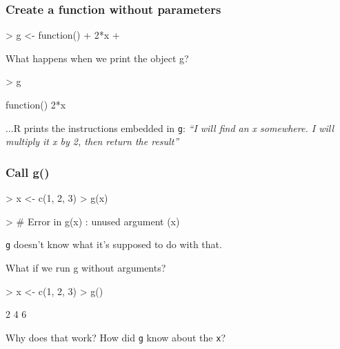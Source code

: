 \documentclass{beamer}
\newcommand{\R}[1]{\texttt{#1}}
\begin{document}
\begin{frame}[fragile]
\frametitle{Create a function without parameters}
\begin{Schunk}
\begin{Sinput}
> g <- function() {
+     2*x
+ }
\end{Sinput}
\end{Schunk}
\pause
What happens when we print the object g?
\begin{Schunk}
\begin{Sinput}
> g
\end{Sinput}
\end{Schunk}
\pause
\begin{Schunk}
\begin{Soutput}
function() {
    2*x
}
\end{Soutput}
\end{Schunk}
...R prints the instructions embedded in \R{g}: \textit{``I will find an x somewhere. I will multiply it x by 2, then return the result''}

\end{frame}





\begin{frame}[fragile]
\frametitle{Call g()}
\begin{Schunk}
\begin{Sinput}
> x <- c(1, 2, 3)
> g(x)
\end{Sinput}
\end{Schunk}
\pause
\begin{Schunk}
\begin{Sinput}
> # Error in g(x) : unused argument (x)
\end{Sinput}
\end{Schunk}
\R{g} doesn't know what it's supposed to do with that.

\pause
What if we run g without arguments?
\begin{Schunk}
\begin{Sinput}
> x <- c(1, 2, 3)
> g()
\end{Sinput}
\end{Schunk}
\pause
\begin{Schunk}
\begin{Soutput}
[1] 2 4 6
\end{Soutput}
\end{Schunk}
Why does that work? How did \R{g} know about the \R{x}?
\end{frame}
\end{document}
